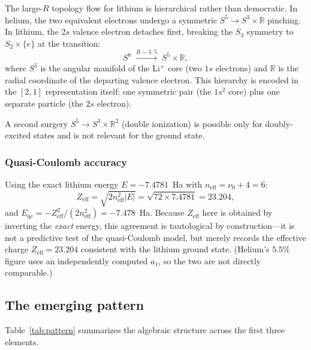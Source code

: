 \documentclass[aps,pra,twocolumn,superscriptaddress,longbibliography]{revtex4-2}
\begin{document}
The large-$R$ topology flow for lithium is hierarchical rather
than democratic.  In helium, the two equivalent electrons undergo
a symmetric $S^5 \to S^3 \times \mathbb{R}$ pinching.  In
lithium, the 2$s$ valence electron detaches first, breaking the
$S_3$ symmetry to $S_2 \times \{e\}$ at the transition:
\begin{equation}
  S^8 \;\xrightarrow{R \sim 3\text{--}5}\; S^5 \times \mathbb{R},
\end{equation}
where $S^5$ is the angular manifold of the Li$^+$ core (two $1s$
electrons) and $\mathbb{R}$ is the radial coordinate of the
departing valence electron.  This hierarchy is encoded in the
$[2,1]$ representation itself: one symmetric pair (the $1s^2$
core) plus one separate particle (the $2s$ electron).

A second surgery $S^5 \to S^3 \times \mathbb{R}^2$ (double
ionization) is possible only for doubly-excited states and is
not relevant for the ground state.

\subsubsection{Quasi-Coulomb accuracy}

Using the exact lithium energy $E = -7.4781$~Ha with
$n_{\mathrm{eff}} = \nu_0 + 4 = 6$:
\begin{equation}
  Z_{\mathrm{eff}} = \sqrt{2 n_{\mathrm{eff}}^2 |E|}
  = \sqrt{72 \times 7.4781} = 23.204,
\end{equation}
and $E_{\mathrm{qc}} = -Z_{\mathrm{eff}}^2/(2 n_{\mathrm{eff}}^2)
= -7.478$~Ha.  Because $Z_{\mathrm{eff}}$ here is obtained by
inverting the \emph{exact} energy, this agreement is tautological by
construction---it is not a predictive test of the quasi-Coulomb
model, but merely records the effective charge
$Z_{\mathrm{eff}} = 23.204$ consistent with the lithium ground
state.  (Helium's $5.5\%$ figure uses an independently computed
$a_1$, so the two are not directly comparable.)

\subsection{The emerging pattern}
\label{sec:pattern}

Table~\ref{tab:pattern} summarizes the algebraic structure across
the first three elements.
\end{document}
